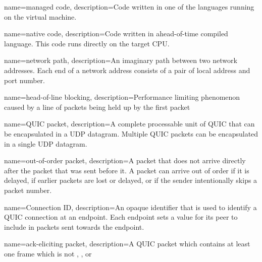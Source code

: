 \makeglossaries


\renewcommand{\glsnamefont}[1]{\capitalisewords{#1}}

\newcommand{\newdefinedabbreviation}[4]{
    \newglossaryentry{#1}
    {
        text={#2},
        long={#3},
        name={#3 (#2)},
        first={#3 (#2)},
        firstplural={\glsentrylong{#1}\glspluralsuffix (\glsentryname{#1}\glspluralsuffix )},
        description={#4}
    }
}

{
  name=managed code,
  description={Code written in one of the \dotnet{} languages running on the \dotnet{} virtual machine.}
}

{
  name=native code,
  description={Code written in ahead-of-time compiled language. This code runs directly on the target CPU.}
}

{
    name=network path,
    description={An imaginary path between two network addresses. Each end of a network address consists of a pair of local address and port number.}
}

{
    name=head-of-line blocking,
    description={Performance limiting phenomenon caused by a line of packets being held up by the first packet}
}

{
    name=QUIC packet,
    description={A complete processable unit of QUIC that can be encapsulated in a UDP datagram.
Multiple QUIC packets can be encapsulated in a single UDP datagram.}
}

{
  name=out-of-order packet,
  description={A packet that does not arrive directly after the packet that was
  sent before it.  A packet can arrive out of order if it is delayed, if earlier packets are
  lost or delayed, or if the sender intentionally skips a packet number.}
}

{
  name=Connection ID,
  description={An opaque identifier that is used to identify a QUIC
  connection at an endpoint.  Each endpoint sets a value for its
  peer to include in packets sent towards the endpoint.}
}

{
  name=ack-eliciting packet,
  description={A QUIC packet which contains at least one frame which is not \PADDING{},  \ACK{}, or \CONNECTIONCLOSE{}}
}

